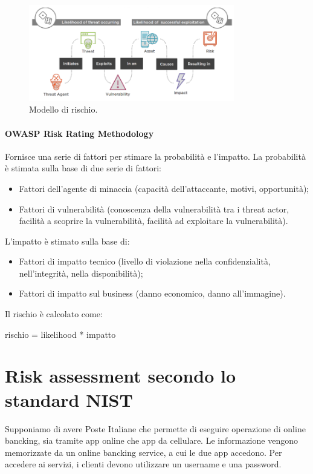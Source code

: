 \begin{figure}
    \centering
    \includegraphics[width=0.8\textwidth]{images/11-8.png}
    \caption{Modello di rischio.}
    \label{fig:11-4}
\end{figure}

\paragraph{OWASP Risk Rating Methodology} Fornisce una serie di fattori per stimare la probabilità e l'impatto. La probabilità è stimata sulla base di due serie di fattori:
\begin{itemize}
    \item Fattori dell'agente di minaccia (capacità dell'attaccante, motivi, opportunità);
    \item Fattori di vulnerabilità (conoscenza della vulnerabilità tra i threat actor, facilità a scoprire la vulnerabilità, facilità ad exploitare la vulnerabilità).
\end{itemize}
\noindent L'impatto è stimato sulla base di:
\begin{itemize}
    \item Fattori di impatto tecnico (livello di violazione nella confidenzialità, nell'integrità, nella disponibilità);
    \item Fattori di impatto sul business (danno economico, danno all'immagine).
\end{itemize}
\noindent Il rischio è calcolato come:
\begin{center}
    rischio = likelihood * impatto
\end{center}

\section{Risk assessment secondo lo standard NIST}

Supponiamo di avere Poste Italiane che permette di eseguire operazione di online bancking, sia tramite app online che app da cellulare. Le informazione vengono memorizzate da un online bancking service, a cui le due app accedono. Per accedere ai servizi, i clienti devono utilizzare un username e una password.

